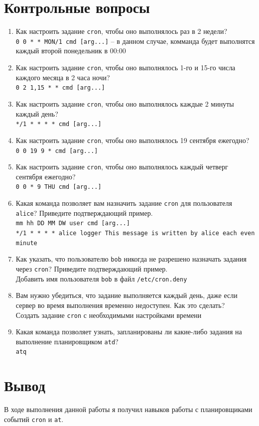 \documentclass[12pt]{article}
\begin{document}
\section{Контрольные вопросы}
\begin{enumerate}
	\item Как настроить задание \texttt{cron}, чтобы оно выполнялось раз в 2 недели? \\
	      \texttt{0 0 * * MON/1 cmd [arg...]} -- в данном случае, комманда будет выполнятся каждый второй понедельник в 00:00
	\item Как настроить задание \texttt{cron}, чтобы оно выполнялось 1-го и 15-го числа каждого месяца в 2 часа ночи? \\
	      \texttt{0 2 1,15 * * cmd [arg...]}
	\item Как настроить задание \texttt{cron}, чтобы оно выполнялось каждые 2 минуты каждый день? \\
	      \texttt{*/1 * * * * cmd [arg...]}
	\item Как настроить задание \texttt{cron}, чтобы оно выполнялось 19 сентября ежегодно? \\
	      \texttt{0 0 19 9 * cmd [arg...]}
	\item Как настроить задание \texttt{cron}, чтобы оно выполнялось каждый четверг сентября ежегодно? \\
	      \texttt{0 0 * 9 THU cmd [arg...]}
	\item Какая команда позволяет вам назначить задание \texttt{cron} для пользователя \texttt{alice}? Приведите подтверждающий пример. \\
	      \texttt{mm hh DD MM DW user cmd [arg...]} \\
	      \texttt{*/1 * * * * alice logger This message is written by alice each even minute}
	\item Как указать, что пользователю \texttt{bob} никогда не разрешено назначать задания через \texttt{cron}? Приведите подтверждающий пример. \\
	      Добавить имя пользователя \texttt{bob} в файл \texttt{/etc/cron.deny}
	\item Вам нужно убедиться, что задание выполняется каждый день, даже если сервер во время выполнения временно недоступен. Как это сделать? \\
	      Создать задание \texttt{cron} с необходимыми настройками времени
	\item Какая команда позволяет узнать, запланированы ли какие-либо задания на выполнение планировщиком \texttt{atd}? \\
	      \texttt{atq}
\end{enumerate}

\section{Вывод}
В ходе выполнения данной работы я получил навыков работы с планировщиками событий \texttt{cron} и \texttt{at}.
\end{document}
